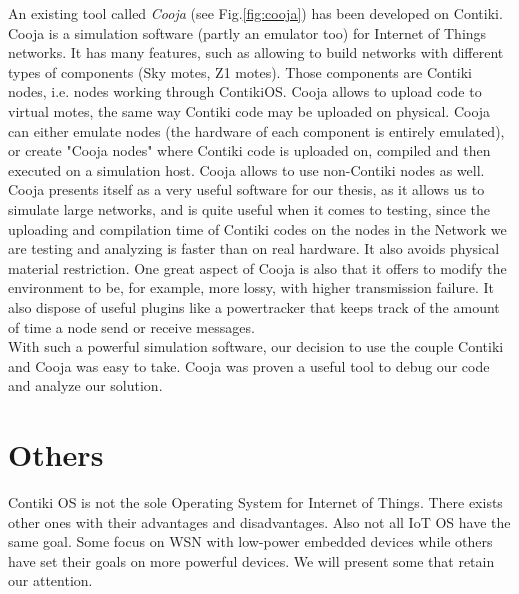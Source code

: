 An existing tool called \textit{Cooja} (see Fig.\ref{fig:cooja}) has been developed on Contiki. Cooja is a simulation software (partly an emulator too) for Internet of Things networks. It has many features, such as allowing to build networks with different types of components (Sky motes, Z1 motes). Those components are Contiki nodes, i.e. nodes working through ContikiOS. Cooja allows to upload code to virtual motes, the same way Contiki code may be uploaded on physical. Cooja can either emulate nodes (the hardware of each component is entirely emulated), or create "Cooja nodes" where Contiki code is uploaded on, compiled and then executed on a simulation host. Cooja allows to use non-Contiki nodes as well. Cooja presents itself as a very useful software for our thesis, as it allows us to simulate large networks, and is quite useful when it comes to testing, since the uploading and compilation time of Contiki codes on the nodes in the Network we are testing and analyzing is faster than on real hardware. It also avoids physical material restriction. One great aspect of Cooja is also that it offers to modify the environment to be, for example, more lossy, with higher transmission failure. It also dispose of useful plugins like a powertracker that keeps track of the amount of time a node send or receive messages.\\

With such a powerful simulation software, our decision to use the couple Contiki and Cooja was easy to take. Cooja was proven a useful tool to debug our code and analyze our solution.

\section{Others}

Contiki OS is not the sole Operating System for Internet of Things. There exists other ones with their advantages and disadvantages. Also not all IoT OS have the same goal. Some focus on WSN with low-power embedded devices while others have set their goals on more powerful devices. We will present some that retain our attention.

